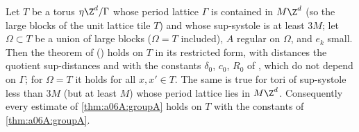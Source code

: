 
\begin{lemma}\label{lem:a06A:torus}
Let $T$ be a torus $\eta\Z^d/\Gamma$ whose period lattice $\Gamma$ is contained in $M\Z^d$ (so the large blocks of the unit lattice tile $T$) and whose sup-systole is at least $3M$; let $\Omega\subset T$ be a union of large blocks ($\Omega=T$ included), $A$ regular on $\Omega$, and $e_k$ small. Then the theorem of \cite{Ba4} (\cite[Prop.~2.1, (2.24)--(2.26)]{Ba1}) holds on $T$ in its restricted form, with distances the quotient sup-distances and with the constants $\delta_0$, $c_0$, $R_0$ of \cite{Ba4}, which do not depend on $\Gamma$; for $\Omega=T$ it holds for all $x,x'\in T$. The same is true for tori of sup-systole less than $3M$ (but at least $M$) whose period lattice lies in $M\Z^d$. Consequently every estimate of \cref{thm:a06A:groupA} holds on $T$ with the constants of \cref{thm:a06A:groupA}.
\end{lemma}

